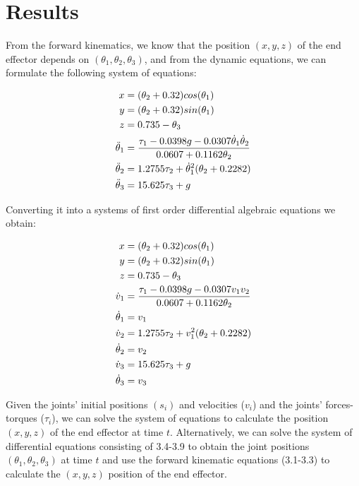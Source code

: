 \documentclass[]{scrreprt}
\begin{document}
\section{Results}

From the forward kinematics, we know that the position $(x,y,z)$ of the end effector depends on $(\theta_1,\theta_2,\theta_3)$, and from the dynamic equations, we can formulate the following system of equations:

\begin{align*}
x &= (\theta_2+0.32)cos(\theta_1)\\
y &= (\theta_2+0.32)sin(\theta_1)\\
z &= 0.735-\theta_3\\
\ddot{\theta}_{1} &= \frac{\tau_1-0.0398g-0.0307\dot{\theta}_{1}\dot{\theta}_{2}}{0.0607+0.1162\theta_2}\\
\ddot{\theta}_{2} &= 1.2755\tau_2 +\dot{\theta}_{1}^2(\theta_2+0.2282)\\
\ddot{\theta}_{3} &= 15.625\tau_3+g
\end{align*}

Converting it into a systems of first order differential algebraic equations we obtain:

\begin{align}
x &= (\theta_2+0.32)cos(\theta_1)\\
y &= (\theta_2+0.32)sin(\theta_1)\\
z &= 0.735-\theta_3\\
\dot{v}_1 &= \frac{\tau_1-0.0398g-0.0307v_1v_2}{0.0607+0.1162\theta_2}\\
\dot{\theta}_{1} &= v_1\\
\dot{v}_2 &= 1.2755\tau_2 +v_1^2(\theta_2+0.2282)\\
\dot{\theta}_{2} &= v_2\\
\dot{v}_3 &= 15.625\tau_3+g\\
\dot{\theta}_{3} &= v_3
\end{align}

Given the joints' initial positions $(s_i)$ and velocities ($v_i$) and the joints' forces-torques ($\tau_i$), we can solve the system of equations to calculate the position $(x,y,z)$ of the end effector at time $t$. Alternatively, we can solve the system of differential equations consisting of 3.4-3.9 to obtain the joint positions $(\theta_1,\theta_2,\theta_3)$ at time $t$ and use the forward kinematic equations (3.1-3.3) to calculate the $(x,y,z)$ position of the end effector.

\end{document}
